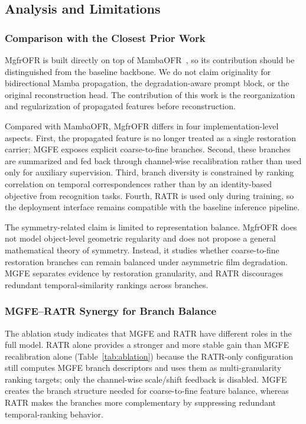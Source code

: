 \subsection{Analysis and Limitations}
\label{subsec:analysis_limitations}

\subsubsection{Comparison with the Closest Prior Work}
\label{subsec:vs_mambaofr}

MgfrOFR is built directly on top of MambaOFR~\cite{mao2025mambaofr}, so its contribution should be distinguished from the baseline backbone. We do not claim originality for bidirectional Mamba propagation, the degradation-aware prompt block, or the original reconstruction head. The contribution of this work is the reorganization and regularization of propagated features before reconstruction.

Compared with MambaOFR, MgfrOFR differs in four implementation-level aspects. First, the propagated feature is no longer treated as a single restoration carrier; MGFE exposes explicit coarse-to-fine branches. Second, these branches are summarized and fed back through channel-wise recalibration rather than used only for auxiliary supervision. Third, branch diversity is constrained by ranking correlation on temporal correspondences rather than by an identity-based objective from recognition tasks. Fourth, RATR is used only during training, so the deployment interface remains compatible with the baseline inference pipeline.

The symmetry-related claim is limited to representation balance. MgfrOFR does not model object-level geometric regularity and does not propose a general mathematical theory of symmetry. Instead, it studies whether coarse-to-fine restoration branches can remain balanced under asymmetric film degradation. MGFE separates evidence by restoration granularity, and RATR discourages redundant temporal-similarity rankings across branches.

\subsubsection{MGFE--RATR Synergy for Branch Balance}
\label{subsec:synergy}

The ablation study indicates that MGFE and RATR have different roles in the full model. RATR alone provides a stronger and more stable gain than MGFE recalibration alone (Table~\ref{tab:ablation}) because the RATR-only configuration still computes MGFE branch descriptors and uses them as multi-granularity ranking targets; only the channel-wise scale/shift feedback is disabled. MGFE creates the branch structure needed for coarse-to-fine feature balance, whereas RATR makes the branches more complementary by suppressing redundant temporal-ranking behavior.

